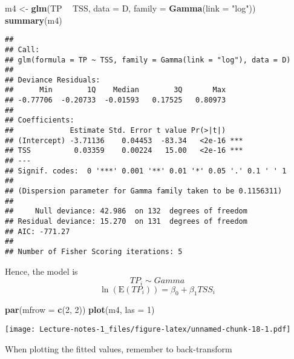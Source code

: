 \documentclass[
]{book}
\newenvironment{Shaded}{\begin{snugshade}}{\end{snugshade}}
\newcommand{\DataTypeTok}[1]{\textcolor[rgb]{0.13,0.29,0.53}{#1}}
\newcommand{\DecValTok}[1]{\textcolor[rgb]{0.00,0.00,0.81}{#1}}
\newcommand{\KeywordTok}[1]{\textcolor[rgb]{0.13,0.29,0.53}{\textbf{#1}}}
\newcommand{\NormalTok}[1]{#1}
\newcommand{\OperatorTok}[1]{\textcolor[rgb]{0.81,0.36,0.00}{\textbf{#1}}}
\newcommand{\OtherTok}[1]{\textcolor[rgb]{0.56,0.35,0.01}{#1}}
\newcommand{\StringTok}[1]{\textcolor[rgb]{0.31,0.60,0.02}{#1}}
\begin{document}
\begin{Shaded}
\begin{Highlighting}[]
\NormalTok{m4 <-}\StringTok{ }\KeywordTok{glm}\NormalTok{(TP }\OperatorTok{~}\StringTok{ }\NormalTok{TSS, }\DataTypeTok{data =}\NormalTok{ D, }\DataTypeTok{family =} \KeywordTok{Gamma}\NormalTok{(}\DataTypeTok{link =} \StringTok{"log"}\NormalTok{))}
\KeywordTok{summary}\NormalTok{(m4)}
\end{Highlighting}
\end{Shaded}

\begin{verbatim}
## 
## Call:
## glm(formula = TP ~ TSS, family = Gamma(link = "log"), data = D)
## 
## Deviance Residuals: 
##      Min        1Q    Median        3Q       Max  
## -0.77706  -0.20733  -0.01593   0.17525   0.80973  
## 
## Coefficients:
##             Estimate Std. Error t value Pr(>|t|)    
## (Intercept) -3.71136    0.04453  -83.34   <2e-16 ***
## TSS          0.03359    0.00224   15.00   <2e-16 ***
## ---
## Signif. codes:  0 '***' 0.001 '**' 0.01 '*' 0.05 '.' 0.1 ' ' 1
## 
## (Dispersion parameter for Gamma family taken to be 0.1156311)
## 
##     Null deviance: 42.986  on 132  degrees of freedom
## Residual deviance: 15.270  on 131  degrees of freedom
## AIC: -771.27
## 
## Number of Fisher Scoring iterations: 5
\end{verbatim}

Hence, the model is
\[TP_i \sim Gamma\]
\[\ln(\text{E}(TP_i)) = \beta_0 + \beta_1 TSS_i\]

\begin{Shaded}
\begin{Highlighting}[]
\KeywordTok{par}\NormalTok{(}\DataTypeTok{mfrow =} \KeywordTok{c}\NormalTok{(}\DecValTok{2}\NormalTok{, }\DecValTok{2}\NormalTok{))}
\KeywordTok{plot}\NormalTok{(m4, }\DataTypeTok{las =} \DecValTok{1}\NormalTok{)}
\end{Highlighting}
\end{Shaded}

\texttt{[image: Lecture-notes-1\_files/figure-latex/unnamed-chunk-18-1.pdf]}

When plotting the fitted values, remember to back-transform

\begin{Shaded}
\end{Shaded}
\end{document}

